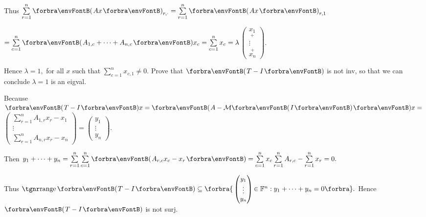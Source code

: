 \documentclass[a4paper, 11pt, UTF8]{article}
\begin{document}
\begin{large}
Thus $\sum\limits_{r=1}^n \Par{Ax}_{r,\cdot}=\sum\limits_{r=1}^n \Par{Ax}_{r,1}$\par\qquad\qquad\qquad\qquad\quad
$=\sum\limits_{c=1}^n\Par{A_{1,c}+\dots+A_{n,c}}x_c=\sum\limits_{c=1}^n x_c=\lambda${\small$\begin{pmatrix}
\underset{+}{x_1}\\ \vdots\\ \overset{+}{x_n}
\end{pmatrix}.$}\par\quad\Hb
Hence $\lambda=1,$ for all $x$ such that $\sum\limits_{c=1}^n x_{c,1}\neq 0.$\PfEnd\vspace{6pt}\quad\Hb
\Or Prove that $\Par{T-I}$ is not inv, so that we can conclude $\lambda=1$ is an eigval.\par\quad\Hb
Because $\Par{T-I}x=\Par{A-\Mt{I}}x=\,${\small$\begin{pmatrix} \sum\limits_{r=1}^n A_{1,r}x_r-x_1\\ \vdots\\ \sum\limits_{r=1}^n A_{n,r}x_r-x_n\end{pmatrix}=\begin{pmatrix} y_1\\ \vdots\\ y_n\end{pmatrix}.$}\par\quad\Hb
Then $y_1+\dots+y_n=\sum\limits_{r=1}^n\sum\limits_{c=1}^n \Par{A_{r,c}x_c-x_r}=\sum\limits_{c=1}^n x_c\sum\limits_{r=1}^n A_{r,c}-\sum\limits_{r=1}^n x_r=0.$\par\vspace{6pt}\quad\Hb
Thus $\range\Par{T-I}\subseteq\Bra{\,${\small$\begin{pmatrix}
y_1 \\ \vdots \\ y_n\end{pmatrix}$}$\,\in\Fbb^n:y_1+\dots+y_n=0}.$ Hence $\Par{T-I}$ is not surj.\PfEnd
\SepLine


\end{large}
\end{document}
